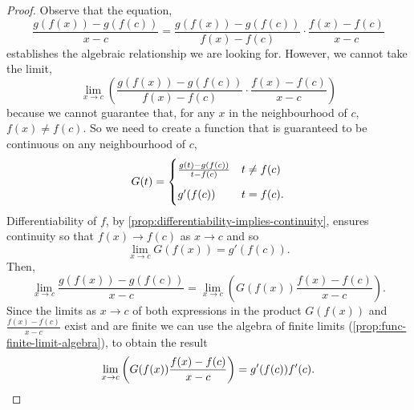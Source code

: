 \documentclass[../MathsNotesBase.tex]{subfiles}
\begin{document}
{		\bigskip
		\begin{proof}
			Observe that the equation,
			\[ \frac{ g(f(x)) - g(f(c)) }{ x - c } = \frac{ g(f(x)) - g(f(c)) }{ f(x) - f(c) } \cdot \frac{ f(x) - f(c) }{ x - c } \]
			establishes the algebraic relationship we are looking for. However, we cannot take the limit,
			\[ \lim_{x \to c} \left( \frac{ g(f(x)) - g(f(c)) }{ f(x) - f(c) } \cdot \frac{ f(x) - f(c) }{ x - c } \right) \]
			because we cannot guarantee that, for any $x$ in the neighbourhood of $c$, ${ f(x) \neq f(c) }$. So we need to create a function that is guaranteed to be continuous on any neighbourhood of $c$,
			\[ G(t) = \begin{cases}
						\frac{ g(t) - g(f(c)) }{ t - f(c) }  & t \neq f(c) \nnn
						g'(f(c))  &  t = f(c).	
					  \end{cases}
			\]
			Differentiability of $f$, by \autoref{prop:differentiability-implies-continuity}, ensures continuity so that ${ f(x) \to f(c) }$ as ${ x \to c }$ and so
			\[ \lim_{x \to c} G(f(x)) = g'(f(c)). \]
			Then,
			\[ \lim_{x \to c} \frac{ g(f(x)) - g(f(c)) }{ x - c } = \lim_{x \to c} \left( G(f(x)) \frac{ f(x) - f(c) }{ x - c } \right). \]
			Since the limits as ${ x \to c }$ of both expressions in the product $G(f(x))$ and $\frac{ f(x) - f(c) }{ x - c }$ exist and are finite we can use the algebra of finite limits (\autoref{prop:func-finite-limit-algebra}), to obtain the result
			\[ \lim_{x \to c} \left( G(f(x)) \frac{ f(x) - f(c) }{ x - c } \right) = g'(f(c)) f'(c). \qedhere \]
		\end{proof}
	
}
\end{document}
